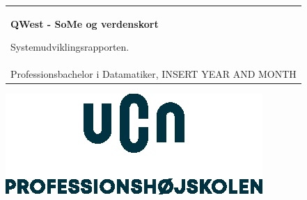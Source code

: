 %
\begin{titlepage}
\pagecolor{ucngrey}\afterpage{\nopagecolor}

\vspace*{\fill}

  \addtolength{\hoffset}{0.5\evensidemargin-0.5\oddsidemargin} %
  \noindent%
  {\color{white}\colorbox{ucnblue}{\begin{tabular}{@{}p{\textwidth}@{}}
    \begin{center}
    \Huge{\textbf{
      QWest - SoMe og verdenskort%
    }}
    \end{center}
    \begin{center}
      \Large{
        Systemudviklingsrapporten.
      }
    \end{center}
    \vspace{0.2cm}
   \begin{center}
    {\Large
      Benyad Jomhur, Lucca Christiansen, Alexandra Østermark, Søren Ravn%
    }\\
    \vspace{0.2cm}
    {\large
    Professionsbachelor i Datamatiker, INSERT YEAR AND MONTH%
    }
   \end{center}
   \vspace{0.2cm}
   \begin{center}
    {\Large
      3. Semester prøven i Systemudvikling
    }
   \end{center}
  \end{tabular}}}
  \vfill
  \begin{center}
    \includegraphics[width=0.2\paperwidth]{figures/formalities/UCN-hovedlogo}
  \end{center}
\end{titlepage}
\clearpage